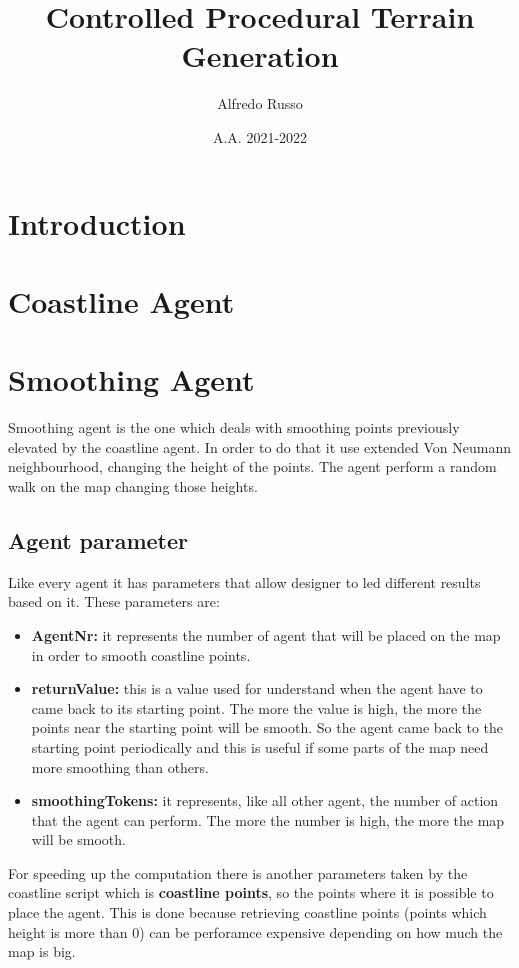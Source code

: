 \documentclass[12pt]{article}
\title{Controlled Procedural Terrain Generation}
\author{Alfredo Russo}
\date{A.A. 2021-2022}
\begin{document}
    \maketitle
    \newpage
    \tableofcontents
    \newpage
    

    \section{Introduction}

    \section{Coastline Agent}

    \section{Smoothing Agent}
    Smoothing agent is the one which deals with smoothing points previously elevated by the coastline agent.
    In order to do that it use extended Von Neumann neighbourhood, changing the height of the points.
    The agent perform a random walk on the map changing those heights.
    
    \subsection{Agent parameter}
    Like every agent it has parameters that allow designer to led different results based on it.
    These parameters are:
    \begin{itemize}
        \item \textbf{AgentNr:} it represents the number of agent that will be placed on the map in order to smooth coastline points.
        \item \textbf{returnValue:} this is a value used for understand when the agent have to came back to its starting point. The more the value is high, the more
        the points near the starting point will be smooth. So the agent came back to the starting point periodically and this is useful if some parts of the map need 
        more smoothing than others.
        \item \textbf{smoothingTokens:} it represents, like all other agent, the number of action that the agent can perform. The more the number is high, the more the map will be smooth.
    \end{itemize}

    For speeding up the computation there is another parameters taken by the coastline script which is \textbf{coastline points}, so the points where it is possible to place the agent.
    This is done because retrieving coastline points (points which height is more than 0) can be perforamce expensive depending on how much the map is big. 
\end{document}
